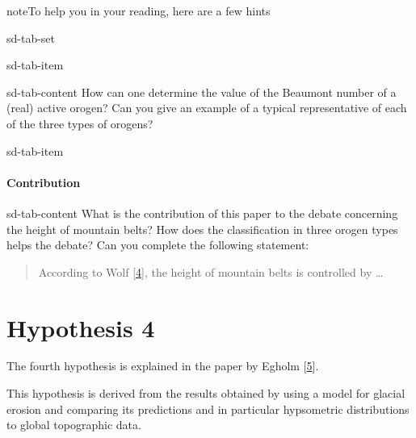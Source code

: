 \documentclass[letterpaper,10pt,english]{jupyterBook}
\let\sphinxpxdimen\pdfpxdimen\else\newdimen\sphinxpxdimen
\begin{document}
\begin{sphinxadmonition}{note}{To help you in your reading, here are a few hints}
\begin{sphinxuseclass}{sd-tab-set}
\begin{sphinxuseclass}{sd-tab-item}
\begin{sphinxuseclass}{sd-tab-content}
\sphinxAtStartPar
How can one determine the value of the Beaumont number of a (real) active orogen? Can you give an example of a typical representative of each of the three types of orogens?

\end{sphinxuseclass}
\end{sphinxuseclass}
\begin{sphinxuseclass}{sd-tab-item}\subsubsection*{Contribution}

\begin{sphinxuseclass}{sd-tab-content}
\sphinxAtStartPar
What is the contribution of this paper to the debate concerning the height of mountain belts? How does the classification in three orogen types helps the debate? Can you complete the following statement:
\begin{quote}

\sphinxAtStartPar
According to Wolf  {[}\hyperlink{cite.references:id7}{4}{]}, the height of mountain belts is controlled by …
\end{quote}

\end{sphinxuseclass}
\end{sphinxuseclass}
\end{sphinxuseclass}\end{sphinxadmonition}

\sphinxstepscope


\chapter{Hypothesis 4}
\label{\detokenize{hypothesis4:hypothesis-4}}\label{\detokenize{hypothesis4::doc}}
\sphinxAtStartPar
The fourth hypothesis is explained in the paper by Egholm  {[}\hyperlink{cite.references:id8}{5}{]}.

\begin{figure}[htbp]
\centering

\noindent\sphinxincludegraphics[height=800\sphinxpxdimen]{{egholm-etal-page}.png}
\end{figure}

\sphinxAtStartPar
This hypothesis is derived from the results obtained by using a model for glacial erosion and comparing its predictions and in particular hypsometric distributions to global topographic data.
\end{document}
